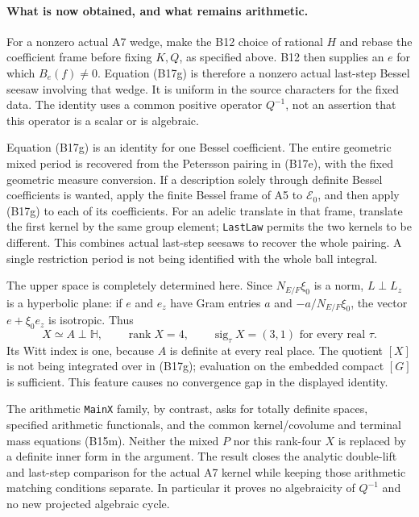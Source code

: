 \documentclass[11pt]{article}
\theoremstyle{definition}\newtheorem{definition}[theorem]{Definition}\newtheorem{remark}[theorem]{Remark}
\begin{document}
\paragraph{What is now obtained, and what remains arithmetic.}
For a nonzero actual A7 wedge, make the B12 choice of rational
$H$ and rebase the coefficient frame before fixing $K,Q$, as
specified above. B12 then supplies an $e$ for which $B_e(f)\ne0$.
Equation (B17g) is therefore a
nonzero actual last-step Bessel seesaw involving that wedge.
It is uniform in the source characters for the fixed data.
The identity uses a common positive operator $Q^{-1}$, not
an assertion that this operator is a scalar or is algebraic.

Equation (B17g) is an identity for one Bessel coefficient.
The entire geometric mixed period is recovered from the
Petersson pairing in (B17e), with the fixed geometric measure
conversion. If a description solely through definite Bessel
coefficients is wanted, apply the finite Bessel frame of A5 to
$\mathcal E_0$, and then apply (B17g) to each of its coefficients.
For an adelic translate in that frame, translate the first
kernel by the same group element; \texttt{LastLaw} permits the
two kernels to be different. This combines actual last-step
seesaws to recover the whole pairing. A single restriction
period is not being identified with the whole ball integral.

The upper space is completely determined here. Since
$N_{E/F}\xi_0$ is a norm, $L\perp L_z$ is a hyperbolic plane:
if $e$ and $e_z$ have Gram entries $a$ and
$-a/N_{E/F}\xi_0$, the vector $e+\xi_0e_z$ is isotropic.
Thus
\[
 X\simeq A\perp\mathbb H,\qquad
 \operatorname{rank}X=4,\qquad
 \operatorname{sig}_\tau X=(3,1)
        \text{ for every real }\tau .
\]
Its Witt index is one, because $A$ is definite at every real
place. The quotient $[X]$ is not being integrated over in
(B17g); evaluation on the embedded compact $[G]$ is sufficient.
This feature causes no convergence gap in the displayed
identity.

The arithmetic \texttt{MainX} family, by contrast, asks for
totally definite spaces, specified arithmetic functionals,
and the common kernel/covolume and terminal mass equations
(B15m). Neither the mixed $P$ nor this rank-four $X$ is replaced
by a definite inner form in the argument. The result closes
the analytic double-lift and last-step comparison for the
actual A7 kernel while keeping those arithmetic matching
conditions separate. In particular it proves no algebraicity
of $Q^{-1}$ and no new projected algebraic cycle.
\end{document}
